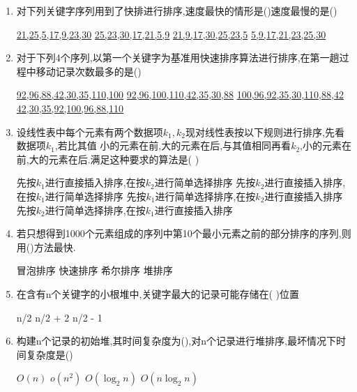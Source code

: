 \documentclass[12pt, a4paper, oneside, UTF8]{ctexbook}
\begin{document}
\begin{enumerate}


    \item 对下列关键字序列用到了快排进行排序,速度最快的情形是()速度最慢的是() 
    \begin{choices}[2]
        \task \underline{21,25,5,17,9,23,30}
        \task \underline{25,23,30,17,21,5,9}
        \task \underline{21,9,17,30,25,23,5}
        \task \underline{5,9,17,21,23,25,30}
    \end{choices}

    \item 对于下列4个序列,以第一个关键字为基准用快速排序算法进行排序,在第一趟过程中移动记录次数最多的是()
    \begin{choices}[2]
        \task \underline{92,96,88,42,30,35,110,100}
        \task \underline{92,96,100,110,42,35,30,88}
        \task \underline{100,96,92,35,30,110,88,42}
        \task \underline{42,30,35,92,100,96,88,110}
    \end{choices}
    \item 设线性表中每个元素有两个数据项$k_1,k_2$现对线性表按以下规则进行排序,先看数据项$k_1$,若比其值
    小的元素在前,大的元素在后,与其值相同再看$k_2$,小的元素在前,大的元素在后.满足这种要求的算法是(   ) 
    \begin{choices}[1]
        \task 先按$k_1$进行直接插入排序,在按$k_2$进行简单选择排序
        \task 先按$k_2$进行直接插入排序,在按$k_1$进行简单选择排序
        \task 先按$k_1$进行简单选择排序,在按$k_2$进行直接插入排序
        \task 先按$k_2$进行简单选择排序,在按$k_1$进行直接插入排序
    \end{choices}


    \item 若只想得到1000个元素组成的序列中第10个最小元素之前的部分排序的序列,则用()方法最快. 
    \begin{choices}
        \task 冒泡排序
        \task 快速排序
        \task 希尔排序
        \task 堆排序
    \end{choices}

    \item 在含有n个关键字的小根堆中,关键字最大的记录可能存储在(   )位置 
    \begin{choices}
        \task n/2 
        \task n/2 + 2 
        \task n/2 - 1
    \end{choices}
    \item 构建n个记录的初始堆,其时间复杂度为(),对n个记录进行堆排序,最坏情况下时间复杂度是()
    \begin{choices}
        \task $O(n)$
        \task $o(n^2)$
        \task $O(\log_2{n})$
        \task $O(n\log_2{n})$
    \end{choices}


\end{enumerate}
\end{document}
